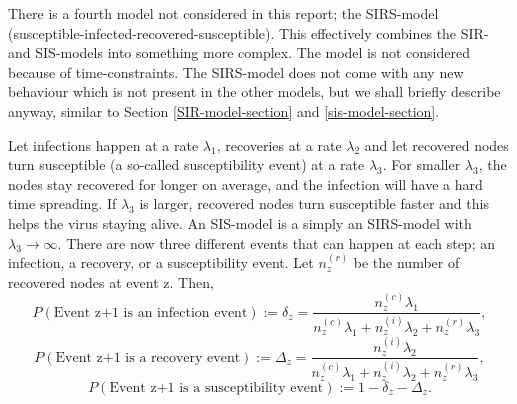 \documentclass[12pt]{article} %
\numberwithin{equation}{section}
\begin{document}
There is a fourth model not considered in this report; the SIRS-model (susceptible-infected-recovered-susceptible). This effectively combines the SIR- and SIS-models into something more complex. The model is not considered because of time-constraints. The SIRS-model does not come with any new behaviour which is not present in the other models, but we shall briefly describe anyway, similar to Section \ref{SIR-model-section} and \ref{sis-model-section}. 

Let infections happen at a rate $\lambda_1$, recoveries at a rate $\lambda_2$ and let recovered nodes turn susceptible (a so-called susceptibility event) at a rate $\lambda_3$. For smaller $\lambda_3$, the nodes stay recovered for longer on average, and the infection will have a hard time spreading. If $\lambda_3$ is larger, recovered nodes turn susceptible faster and this helps the virus staying alive. An SIS-model is a simply an SIRS-model with $\lambda_3 \rightarrow \infty$. There are now three different events that can happen at each step; an infection, a recovery, or a susceptibility event. Let $n_z^{(r)}$ be the number of recovered nodes at event z. Then,
\begin{equation}\label{SIRS-P1}
    P(\text{Event z+1 is an infection event}) := \delta_z = \frac{n^{(c)}_z\lambda_1}{n^{(c)}_z\lambda_1+n^{(i)}_z\lambda_2+n_z^{(r)}\lambda_3},
\end{equation}
\begin{equation}\label{SIRS-P2}
    P(\text{Event z+1 is a recovery event}) := \Delta_z = \frac{n^{(i)}_z\lambda_2}{n^{(c)}_z\lambda_1+n^{(i)}_z\lambda_2+n_z^{(r)}\lambda_3},
\end{equation}
\begin{equation}\label{SIRS-P3}
    P(\text{Event z+1 is a susceptibility event}) := 1-\delta_z-\Delta_z.
\end{equation}
\end{document}
